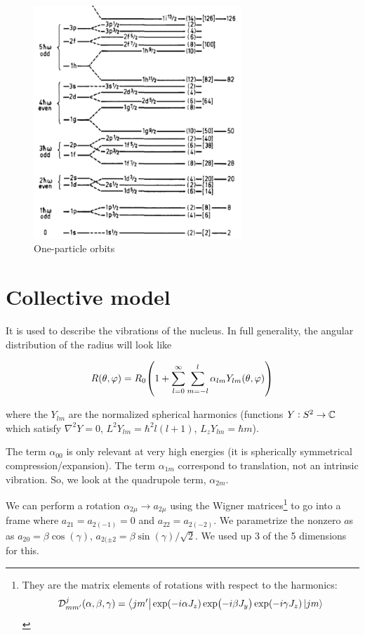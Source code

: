 \documentclass[main.tex]{subfiles}
\begin{document}
\begin{figure}[H]
    \centering
    \includegraphics[width=0.7\textwidth]{figures/nuclear_shells.png}
    \caption{One-particle orbits}
    \label{fig:shell-orbits}
\end{figure}

\section{Collective model}

It is used to describe the vibrations of the nucleus.
In full generality, the angular distribution of the radius will look like

\begin{equation}
    R (\theta, \varphi) = R_0 \qty(1 + \sum _{l=0}   ^{\infty} \sum _{m=-l}   ^{l} \alpha_{lm} Y_{lm} (\theta, \varphi))
\end{equation}

where the \(Y_{lm}\) are the normalized spherical harmonics (functions \(Y: S^2 \rightarrow \mathbb{C}\) which satisfy \(\nabla^2 Y = 0\), \(L^2 Y_{lm} = \hbar^2 l (l+1)\), \(L_z Y_{lm} = \hbar m\)).

The term \(\alpha_{00}\) is only relevant at very high energies (it is spherically symmetrical compression/expansion). The term \(\alpha_{1m}\) correspond to translation, not an intrinsic vibration. So, we look at the quadrupole term, \(\alpha_{2m}\).

We can perform a rotation \(\alpha_{2 \mu} \rightarrow a _{2 \mu} \) using the Wigner matrices\footnote{They are the matrix elements of rotations with respect to the harmonics:
\begin{equation}
    \mathcal D^j_{mm'}(\alpha, \beta, \gamma) = \bra{jm'} \exp(-i \alpha J_z) \exp(-i \beta J_y) \exp(-i \gamma J_z) \ket{jm}
\end{equation}
}
to go into a frame where \(a_{21} = a_{2(-1)} = 0\) and \(a_{22} = a_{2(-2)}\). We parametrize the nonzero \(a\)s as \(a_{20} = \beta \cos(\gamma) \), \(a_{2(\pm 2} = \beta \sin(\gamma) / \sqrt{2}\). We used up 3 of the 5 dimensions for this.
\end{document}
